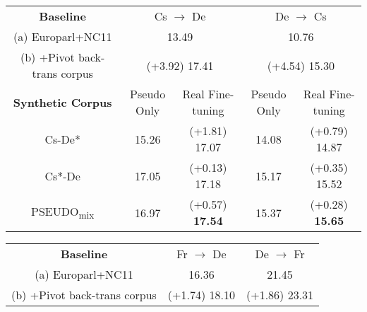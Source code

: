 \documentclass[11pt,letterpaper]{article}
\begin{document}
\begin{table*}[t]
\caption{Translation results (BLEU) for Pseudo Only and Real Fine-tuning scenarios evaluated on the newstest 2011 set. For the results of the Real Fine-tuning, the values in parentheses are improvements in BLEU compared to the Pseudo Only setting. The highest BLEU for each translation task is bold-faced.}
\label{tab:real_finetuning_newstest2011}
\end{table*}

\begin{table*}[t]
\centering
	\begin{subtable}[t]{\columnwidth}
		\centering
		\begin{tabular}{c||cc||cc}
        		\hline
                \textbf{Baseline} & \multicolumn{2}{c||}{Cs \(\rightarrow\) De} & \multicolumn{2}{c}{De \(\rightarrow\) Cs} \\
				(a) Europarl+NC11 & \multicolumn{2}{c||}{13.49} & \multicolumn{2}{c}{10.76} \\ 
                (b) +Pivot back-trans corpus & \multicolumn{2}{c||}{{\scriptsize(+3.92)} 17.41} & \multicolumn{2}{c}{{\scriptsize(+4.54)} 15.30} \\ \hline\hline
				\textbf{Synthetic Corpus} & Pseudo Only & Real Fine-tuning & Pseudo Only & Real Fine-tuning \\
                Cs-De* & 15.26 & {\scriptsize(+1.81)} 17.07 & 14.08 & {\scriptsize(+0.79)} 14.87 \\
                Cs*-De & 17.05 & {\scriptsize(+0.13)} 17.18 & 15.17 & {\scriptsize(+0.35)} 15.52 \\
                PSEUDO\textsubscript{mix} & 16.97 & {\scriptsize(+0.57)} \textbf{17.54} & 15.37 & {\scriptsize(+0.28)} \textbf{15.65} \\
            \hline
		\end{tabular}
		\label{tab:real_finetuning_csde_newstest2012}
        \caption{Cs \(\leftrightarrow\) De}
	\end{subtable}%
	\qquad
    \begin{subtable}[t]{\columnwidth}
		\centering
		\begin{tabular}{c||cc||cc}
        		\hline
                \textbf{Baseline} & \multicolumn{2}{c||}{Fr \(\rightarrow\) De} & \multicolumn{2}{c}{De \(\rightarrow\) Fr} \\
				(a) Europarl+NC11 & \multicolumn{2}{c||}{16.36} & \multicolumn{2}{c}{21.45} \\ 
                (b) +Pivot back-trans corpus & \multicolumn{2}{c||}{{\scriptsize(+1.74)} 18.10} & \multicolumn{2}{c}{{\scriptsize(+1.86)} 23.31} \\ \hline\hline

\end{tabular}
\end{subtable}
\end{table*}
\end{document}
